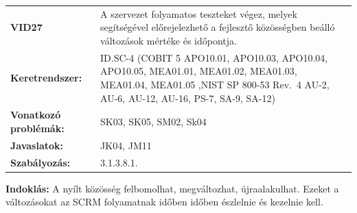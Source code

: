 \documentclass[12pt,magyar,a4paper,oneside]{scrreprt}
\begin{document}
\begin{longtable}[]{@{}ll@{}}
\toprule
\endhead
\begin{minipage}[t]{0.16\columnwidth}\raggedright
\textbf{VID27}\strut
\end{minipage} & \begin{minipage}[t]{0.79\columnwidth}\raggedright
A szervezet folyamatos teszteket végez, melyek segítségével
előrejelezhető a fejlesztő közösségben beálló változások mértéke és
időpontja.\strut
\end{minipage}\tabularnewline
\begin{minipage}[t]{0.16\columnwidth}\raggedright
\textbf{Keretrendszer:}\strut
\end{minipage} & \begin{minipage}[t]{0.79\columnwidth}\raggedright
ID.SC-4 (COBIT 5 APO10.01, APO10.03, APO10.04, APO10.05, MEA01.01,
MEA01.02, MEA01.03, MEA01.04, MEA01.05 ,NIST SP 800-53 Rev.~4 AU-2,
AU-6, AU-12, AU-16, PS-7, SA-9, SA-12)\strut
\end{minipage}\tabularnewline
\begin{minipage}[t]{0.16\columnwidth}\raggedright
\textbf{Vonatkozó problémák:}\strut
\end{minipage} & \begin{minipage}[t]{0.79\columnwidth}\raggedright
SK03, SK05, SM02, Sk04\strut
\end{minipage}\tabularnewline
\begin{minipage}[t]{0.16\columnwidth}\raggedright
\textbf{Javaslatok:}\strut
\end{minipage} & \begin{minipage}[t]{0.79\columnwidth}\raggedright
JK04, JM11\strut
\end{minipage}\tabularnewline
\begin{minipage}[t]{0.16\columnwidth}\raggedright
\textbf{Szabályozás:}\strut
\end{minipage} & \begin{minipage}[t]{0.79\columnwidth}\raggedright
3.1.3.8.1.\strut
\end{minipage}\tabularnewline
\bottomrule
\end{longtable}

\textbf{Indoklás: } A nyílt közösség felbomolhat, megváltozhat,
újraalakulhat. Ezeket a változásokat az SCRM folyamatnak időben időben
észlelnie és kezelnie kell.
\end{document}
